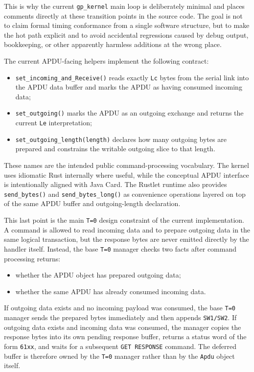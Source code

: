 This is why the current \texttt{gp\_kernel} main loop is deliberately
minimal and places comments directly at these transition points in the
source code. The goal is not to claim formal timing conformance from a
single software structure, but to make the hot path explicit and to
avoid accidental regressions caused by debug output, bookkeeping, or
other apparently harmless additions at the wrong place.

The current APDU-facing helpers implement the following contract:

\begin{itemize}
\item \texttt{set\_incoming\_and\_Receive()} reads exactly
  \texttt{Lc} bytes from the serial link into the APDU data buffer and
  marks the APDU as having consumed incoming data;
\item \texttt{set\_outgoing()} marks the APDU as an outgoing exchange
  and returns the current \texttt{Le} interpretation;
\item \texttt{set\_outgoing\_length(length)} declares how many outgoing
  bytes are prepared and constrains the writable outgoing slice to that
  length.
\end{itemize}

These names are the intended public command-processing vocabulary. The
kernel uses idiomatic Rust internally where useful, while the conceptual
APDU interface is intentionally aligned with Java Card.
The Rustlet runtime also provides \texttt{send\_bytes()} and
\texttt{send\_bytes\_long()} as convenience operations layered on top of the
same APDU buffer and outgoing-length declaration.

This last point is the main \texttt{T=0} design constraint of the
current implementation. A command is allowed to read incoming data and
to prepare outgoing data in the same logical transaction, but the
response bytes are never emitted directly by the handler itself.
Instead, the base \texttt{T=0} manager checks two facts after command
processing returns:

\begin{itemize}
\item whether the APDU object has prepared outgoing data;
\item whether the same APDU has already consumed incoming data.
\end{itemize}

If outgoing data exists and no incoming payload was consumed, the base
\texttt{T=0} manager sends the prepared bytes immediately and then appends
\texttt{SW1/SW2}. If outgoing data exists and incoming data was
consumed, the manager copies the response bytes into its own pending
response buffer, returns a status word of the form \texttt{61xx}, and
waits for a subsequent \texttt{GET RESPONSE} command. The deferred
buffer is therefore owned by the \texttt{T=0} manager rather than by the
\texttt{Apdu} object itself.

